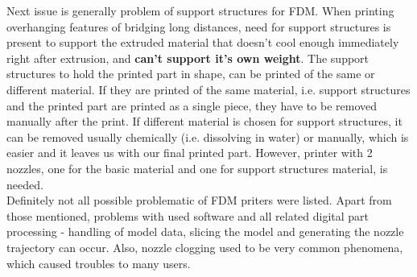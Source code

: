 \documentclass[a4paper, twoside, 11pt]{report}
\begin{document}
	Next issue is generally problem of support structures for FDM. When printing overhanging features of bridging long distances, need for support structures is present to support the extruded material that doesn't cool enough immediately right after extrusion, and \textbf{can't support it's own weight}. The support structures to hold the printed part in shape, can be printed of the same or different material. If they are printed of the same material, i.e. support structures and the printed part are printed as a single piece, they have to be removed manually after the print. If different material is chosen for support structures, it can be removed usually chemically (i.e. dissolving in water) or manually, which is easier and it leaves us with our final printed part. However, printer with 2 nozzles, one for the basic material and one for support structures material, is needed.\\
	Definitely not all possible problematic of FDM priters were listed. Apart from those mentioned, problems with used software and all related digital part processing - handling of model data, slicing the model and generating the nozzle trajectory can occur. Also, nozzle clogging used to be very common phenomena, which caused troubles to many users.
\end{document}
